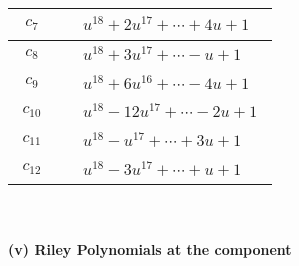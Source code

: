 \documentclass[1p]{elsarticle_modified}
\theoremstyle{definition}
\begin{document}
\begin{tabular}{m{50pt}|m{274pt}}
\hline $$\begin{aligned}c_{7}\end{aligned}$$&$\begin{aligned}
&u^{18}+2 u^{17}+\cdots+4 u+1
\end{aligned}$\\
\hline $$\begin{aligned}c_{8}\end{aligned}$$&$\begin{aligned}
&u^{18}+3 u^{17}+\cdots- u+1
\end{aligned}$\\
\hline $$\begin{aligned}c_{9}\end{aligned}$$&$\begin{aligned}
&u^{18}+6 u^{16}+\cdots-4 u+1
\end{aligned}$\\
\hline $$\begin{aligned}c_{10}\end{aligned}$$&$\begin{aligned}
&u^{18}-12 u^{17}+\cdots-2 u+1
\end{aligned}$\\
\hline $$\begin{aligned}c_{11}\end{aligned}$$&$\begin{aligned}
&u^{18}- u^{17}+\cdots+3 u+1
\end{aligned}$\\
\hline $$\begin{aligned}c_{12}\end{aligned}$$&$\begin{aligned}
&u^{18}-3 u^{17}+\cdots+u+1
\end{aligned}$\\
\hline
\end{tabular}\\~\\
\newpage\renewcommand{\arraystretch}{1}
\flushleft \textbf{(v) Riley Polynomials at the component}\newline \\
\end{document}
